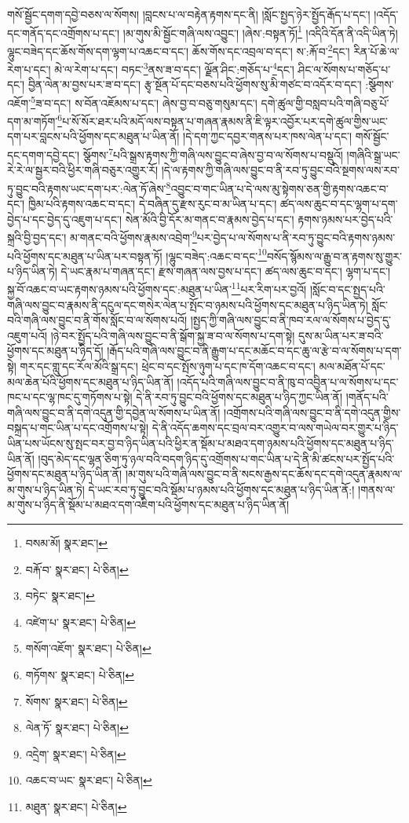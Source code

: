 གསོ་སྦྱོང་དགག་དབྱེ་བཅས་ལ་སོགས། །བླངས་པ་ལ་བརྟེན་རྟགས་དང་ནི། །སློང་སྤྱད་ཉེར་སྤྱོད་རྒོད་པ་དང་། །འདོད་དང་གནོད་དང་འགྲོགས་པ་དང་། །མ་གུས་མི་སྦྱོང་གཞི་ལས་འབྱུང་། །ཞེས་:བསྟན་ཏོ།\footnote{བསམ་མོ།  སྣར་ཐང་། } །འདིའི་དོན་ནི་འདི་ཡིན་ཏེ། ལྷུང་བཟེད་དང་ཆོས་གོས་དག་ལྷག་པ་འཆང་བ་དང་། ཆོས་གོས་དང་འབྲལ་བ་དང་། ས་:རྐོ་བ་\footnote{བརྐོ་བ་  སྣར་ཐང་།  པེ་ཅིན། }དང་། རིན་པོ་ཆེ་ལ་རེག་པ་དང་། མེ་ལ་རེག་པ་དང་། བཏང་\footnote{བཏེང་  སྣར་ཐང་། }ནས་ཟ་བ་དང་། ལྗོན་ཤིང་:གཅོད་པ་\footnote{འཛེག་པ་  སྣར་ཐང་།  པེ་ཅིན། }དང་། ཤིང་ལ་སོགས་པ་གཅོད་པ་དང་། བྱིན་ལེན་མ་བྱས་པར་ཟ་བ་དང་། རྩྭ་སྔོན་པོ་དང་བཅས་པའི་ཕྱོགས་སུ་མི་གཙང་བ་འདོར་བ་དང་། :སྩོགས་འཇོག་\footnote{གསོག་འཇོག་  སྣར་ཐང་།  པེ་ཅིན། }ཟ་བ་དང་། ས་བོན་འཇོམས་པ་དང་། ཞེས་བྱ་བ་བཅུ་གསུམ་དང་། དགེ་ཚུལ་གྱི་བསླབ་པའི་གཞི་བཅུ་པོ་དག་མ་གཏོག་\footnote{གཏོགས་  སྣར་ཐང་།  པེ་ཅིན། }པ་སོ་སོར་ཐར་པའི་མདོ་ལས་བསྟན་པ་གཞན་རྣམས་ནི་ཇི་ལྟར་འབྱོར་པར་དགེ་ཚུལ་གྱིས་ཡང་དག་པར་བླངས་པའི་ཕྱོགས་དང་མཐུན་པ་ཡིན་ནོ། །དེ་དག་ཀྱང་དབྱར་གནས་པར་ཁས་ལེན་པ་དང་། གསོ་སྦྱོང་དང་དགག་དབྱེ་དང་། སྩོགས་\footnote{སོགས་  སྣར་ཐང་།  པེ་ཅིན། }པའི་སྒྲས་རྟགས་ཀྱི་གཞི་ལས་བྱུང་བ་ཞེས་བྱ་བ་ལ་སོགས་པ་བསྡུའོ། །གཞིའི་སྒྲ་ཡང་རེ་རེ་ལ་སྦྱར་བའི་ཕྱིར་གཞི་བཅུར་འགྱུར་རོ། །དེ་ལ་རྟགས་ཀྱི་གཞི་ལས་བྱུང་བ་ནི་རབ་ཏུ་བྱུང་བའི་སྔགས་ལས་རབ་ཏུ་བྱུང་བའི་རྟགས་ཡང་དག་པར་:ལེན་ཏོ་ཞེས་\footnote{ལེན་ཏོ་  སྣར་ཐང་།  པེ་ཅིན། }འབྱུང་བ་གང་ཡིན་པ་དེ་ལས་མུ་སྟེགས་ཅན་གྱི་རྟགས་འཆང་བ་དང་། ཁྱིམ་པའི་རྟགས་འཆང་བ་དང་། དེ་བཞིན་དུ་རྫས་རུང་བ་མ་ཡིན་པ་དང་། ཚད་ལས་ཆུང་བ་དང་ལྷག་པ་དག་བྱེད་པ་དང་བྱེད་དུ་འཇུག་པ་དང་། སེན་མོའི་བྱི་དོར་མ་གནང་བ་རྣམས་བྱེད་པ་དང་། རྟགས་ཉམས་པར་བྱེད་པའི་སྐྲའི་བྱི་བྱད་དང་། མ་གནང་བའི་ཕྱོགས་རྣམས་འབྲེག་\footnote{འདྲེག་  སྣར་ཐང་།  པེ་ཅིན། }པར་བྱེད་པ་ལ་སོགས་པ་ནི་རབ་ཏུ་བྱུང་བའི་རྟགས་ཉམས་པའི་ཕྱོགས་དང་མཐུན་པ་ཡིན་པར་བསྟན་ཏོ། །ལྷུང་བཟེད་:འཆང་བ་དང་\footnote{འཆང་བ་ཡང་  སྣར་ཐང་།  པེ་ཅིན། }བསོད་སྙོམས་ལ་རྒྱུ་བ་ན་རྟགས་སུ་གྱུར་པ་ཉིད་ཡིན་ཏེ། དེ་ཡང་རྣམ་པ་གཞན་དང་། རྫས་གཞན་ལས་བྱས་པ་དང་། ཚད་ལས་ཆུང་བ་དང་། ལྷག་པ་དང་། སྐྱ་བོ་འཆང་བ་ཡང་རྟགས་ཉམས་པའི་ཕྱོགས་དང་:མཐུན་པ་ཡིན་\footnote{མཐུན་  སྣར་ཐང་།  པེ་ཅིན། }པར་རིག་པར་བྱའོ། །སློང་བ་དང་སྤྱད་པའི་གཞི་ལས་བྱུང་བ་རྣམས་ནི་དངུལ་དང་གསེར་ལེན་པ་སྤོང་བ་ཉམས་པའི་ཕྱོགས་དང་མཐུན་པ་ཉིད་ཡིན་ཏེ། སློང་བའི་གཞི་ལས་བྱུང་བ་ནི་གོས་སློང་བ་ལ་སོགས་པའོ། །སྤྱད་ཀྱི་གཞི་ལས་བྱུང་བ་ནི་ཁབ་རལ་ལ་སོགས་པ་བྱེད་དུ་འཇུག་པའོ། །ཉེ་བར་སྤྱོད་པའི་གཞི་ལས་བྱུང་བ་ནི་སྒོག་སྐྱ་ཟ་བ་ལ་སོགས་པ་དག་སྟེ། དུས་མ་ཡིན་པར་ཟ་བའི་ཕྱོགས་དང་མཐུན་པ་ཉིད་དོ། །རྒོད་པའི་གཞི་ལས་བྱུང་བ་ནི་རྒྱུག་པ་དང་མཆོང་བ་དང་ཆུ་ལ་རྩེ་བ་ལ་སོགས་པ་དག་སྟེ། གར་དང་གླུ་དང་རོལ་མོའི་སྒྲ་དང་། ཕྲེང་བ་དང་སྤོས་ཉུག་པ་དང་ཁ་དོག་འཆང་བ་དང་། མལ་མཐོན་པོ་དང་མལ་ཆེན་པོའི་ཕྱོགས་དང་མཐུན་པ་ཉིད་ཡིན་ནོ། །འདོད་པའི་གཞི་ལས་བྱུང་བ་ནི་ཁུ་བ་འབྱིན་པ་ལ་སོགས་པ་དང་ཁང་པ་དང་ལྷ་ཁང་དུ་གཏོགས་པ་སྟེ། དེ་ནི་རབ་ཏུ་བྱུང་བའི་ཕྱོགས་དང་མཐུན་པ་ཉིད་ཀྱང་ཡིན་ནོ། །གནོད་པའི་གཞི་ལས་བྱུང་བ་ནི་དགེ་འདུན་གྱི་དབྱེན་ལ་སོགས་པ་ཡིན་ནོ། །འགྲོགས་པའི་གཞི་ལས་བྱུང་བ་ནི་དགེ་འདུན་གྱིས་བསྐྲད་པ་གང་ཡིན་པ་དང་འགྲོགས་པ་སྟེ། དེ་ནི་འདོད་ཆགས་དང་བྲལ་བར་འགྱུར་བ་ལས་གཡེལ་བར་གྱུར་པ་ཉིད་ཡིན་པས་ཡོངས་སུ་སྤང་བར་བྱ་བ་ཉིད་ཡིན་པའི་ཕྱིར་ན་སྡོམ་པ་མཐའ་དག་ཉམས་པའི་ཕྱོགས་དང་མཐུན་པ་ཉིད་ཡིན་ནོ། །བུད་མེད་དང་ལྷན་ཅིག་ཏུ་ཉལ་བའི་བདག་ཉིད་དུ་འགྲོགས་པ་གང་ཡིན་པ་དེ་ནི་མི་ཚངས་པར་སྤྱོད་པའི་ཕྱོགས་དང་མཐུན་པ་ཉིད་ཡིན་ནོ། །མ་གུས་པའི་གཞི་ལས་བྱུང་བ་ནི་སངས་རྒྱས་དང་ཆོས་དང་དགེ་འདུན་རྣམས་ལ་མ་གུས་པ་ཉིད་ཡིན་ཏེ། དེ་ཡང་རབ་ཏུ་བྱུང་བའི་སྡོམ་པ་ཉམས་པའི་ཕྱོགས་དང་མཐུན་པ་ཉིད་ཡིན་ནོ:། །གནས་ལ་མ་གུས་པ་ཉིད་ནི་སྡོམ་པ་མཐའ་དག་འཇིག་པའི་ཕྱོགས་དང་མཐུན་པ་ཉིད་ཡིན་ནོ། 